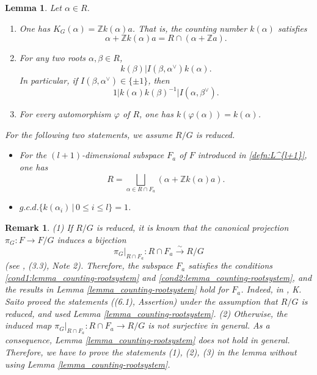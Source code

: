 \documentclass[11pt]{amsart}
\newcommand{\Z}{\mathbb{Z}}
\newcommand{\Aut}{\mathrm{Aut}}
\newtheorem{lemma}[thm]{Lemma}%
\newtheorem{rem}[thm]{Remark}%
\begin{document}
\begin{lemma}\label{lemma:countings1}
Let $\alpha\in R$.
\begin{enumerate}
\item One has $K_G(\alpha)=\Z k(\alpha)a$. That is, 
the counting number $k(\alpha)$ satisfies 
\begin{equation}\label{counting-number}
\alpha+\Z k(\alpha)a=R\cap (\alpha+\Z a).
\end{equation}
\item For any two roots $\alpha, \beta \in R$, 
\begin{equation}\label{countings-division}
k(\beta) \vert I(\beta, \alpha^\vee)k(\alpha). 
\end{equation}
In particular, if $I(\beta, \alpha^\vee)\in \{\pm 1\}$, then
\[ 1 \vert k(\alpha)k(\beta)^{-1} \vert I(\alpha, \beta^\vee). \]
\item For every automorphism $\varphi$ of $R$, one has $k(\varphi(\alpha))=k(\alpha)$. 
\end{enumerate}
For the following two statements, we assume $R/G$ is reduced. 
\begin{itemize}
\item[(4)] For the $(l+1)$-dimensional subspace $F_a$ of $F$ introduced in 
\eqref{defn:L^{l+1}}, one has 
\begin{equation}\label{eq:description-redR}
R=\bigsqcup_{\alpha \in R \cap F_a}(\alpha+\Z k(\alpha)a).
\end{equation} 
\item[(5)] $g.c.d.\{k(\alpha_i)\,|\,0\leq i\leq l\}=1$.
\end{itemize}
\end{lemma}

\begin{rem}\label{rem:countings1}
{\rm (1)}
If $R/G$ is reduced, 
it is known that the canonical projection $\pi_G:F\to F/G$ induces a bijection
\begin{equation}\label{eq:isom-p_G}
\pi_G|_{R\cap F_a}:R \cap F_a\xrightarrow{\sim}R/G
\end{equation}
{\rm (}see \cite{Saito1985}, {\rm (3.3), Note 2}{\rm )}. Therefore, the subspace $F_a$ satisfies the
conditions \eqref{cond1:lemma_counting-rootsystem} and 
\eqref{cond2:lemma_counting-rootsystem}, and the results in Lemma 
\ref{lemma_counting-rootsystem} hold for $F_a$. Indeed, in \cite{Saito1985}, 
K. Saito proved the statements {\rm ((6.1), Assertion)} under the assumption that
$R/G$ is reduced, and used Lemma \ref{lemma_counting-rootsystem}. 
\vskip 1mm
\noindent
{\rm (2)}
Otherwise, the induced map 
$\pi_G|_{R\cap F_a}:R\cap F_a \longrightarrow R/G$ is {\it not} surjective in general.
As a consequence, Lemma \ref{lemma_counting-rootsystem} {\it does not} 
hold in general. Therefore, we have to prove the statements {\rm (1), (2), (3)} 
in the lemma without using Lemma  \ref{lemma_counting-rootsystem}.
\end{rem}
\end{document}
